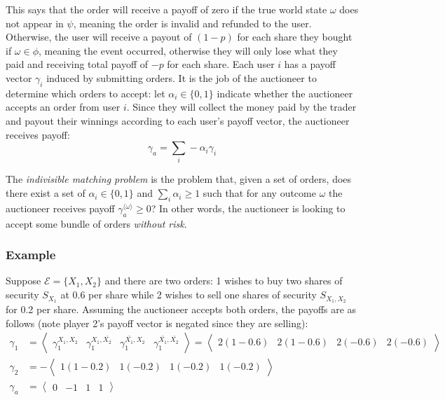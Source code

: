 This says that the order will receive a payoff of zero if the true world state
$\omega$ does not appear in $\psi$, meaning the order is invalid and refunded
to the user. Otherwise, the user will receive a payout of $(1-p)$ for each
share they bought if $\omega \in \phi$, meaning the event occurred, otherwise
they will only lose what they paid and receiving total payoff of $-p$ for each
share. Each user $i$ has a payoff vector $\gamma_i$ induced by submitting
orders. It is the job of the auctioneer to determine which orders to accept:
let $\alpha_i \in \{0,1\}$ indicate whether the auctioneer accepts an order
from user $i$. Since they will collect the money paid by the trader and payout
their winnings according to each user's payoff vector, the auctioneer receives
payoff:
$$
\gamma_a = \sum_i -\alpha_i \gamma_i
$$

The \emph{indivisible matching problem} is the problem that, given a set of
orders, does there exist a set of $\alpha_i \in \{0,1\}$ and $\sum_i \alpha_i
\ge 1$ such that for any outcome $\omega$ the auctioneer receives payoff
$\gamma_a^{\langle \omega \rangle} \ge 0$? In other words, the auctioneer is
looking to accept some bundle of orders \emph{without risk}.

\subsubsection*{Example}

Suppose $\mathcal{E} = \{X_1, X_2\}$ and there are two orders: 1 wishes to buy
two shares of security $S_{X_1}$ at 0.6 per share while 2 wishes to sell one
shares of security $S_{X_1,X_2}$ for 0.2 per share. Assuming the auctioneer
accepts both orders, the payoffs are as follows (note player 2's payoff vector
is negated since they are selling):
%
\begin{equation*}
	\begin{aligned}
		\gamma_1 & = \left\langle \begin{matrix}
			\gamma_1^{X_1,X_2} &
			\gamma_1^{X_1,\bar{X_2}} &
			\gamma_1^{\bar{X_1},X_2} &
		\gamma_1^{\bar{X_1},\bar{X_2}} \end{matrix} \right\rangle 
%
		 = \left\langle \begin{matrix}
			2(1-0.6) & 2(1-0.6) & 2(-0.6) & 2(-0.6) \end{matrix} \right\rangle \\
%
		\gamma_2 & = - \left\langle \begin{matrix}
			1(1-0.2) & 1(-0.2) & 1(-0.2) & 1(-0.2) \end{matrix} \right\rangle \\
%
		\gamma_a & = \left\langle \begin{matrix}
			0 & -1 & 1 & 1 \end{matrix} \right\rangle
	\end{aligned}
\end{equation*}

